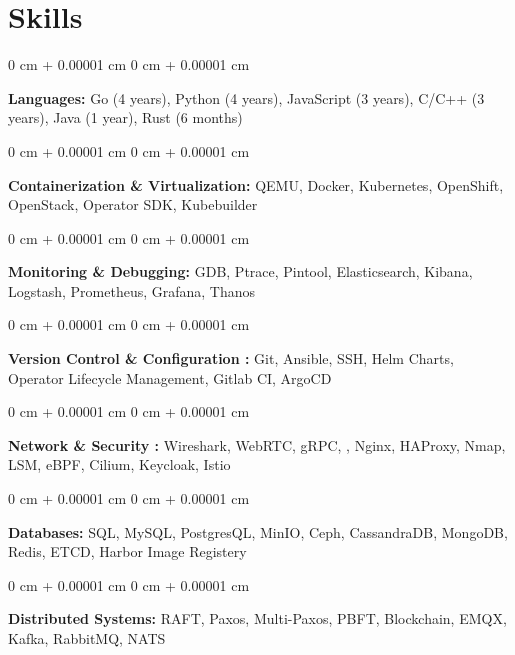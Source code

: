 \documentclass[10pt, letterpaper]{article}
\newenvironment{onecolentry}{
    \begin{adjustwidth}{
        0 cm + 0.00001 cm
    }{
        0 cm + 0.00001 cm
    }
}{
    \end{adjustwidth}
} %
\begin{document}
    \section{Skills}
        \begin{onecolentry}
            \textbf{Languages:} Go (4 years), \hfill Python (4 years), \hfill JavaScript (3 years), \hfill C/C++ (3 years), \hfill Java (1 year), \hfill Rust (6 months)
        \end{onecolentry}
        \vspace{0.15 cm}
        \begin{onecolentry}
            \textbf{Containerization \& Virtualization:} QEMU, \hfill Docker, \hfill Kubernetes, \hfill OpenShift, \hfill OpenStack, \hfill Operator SDK, \hfill Kubebuilder
        \end{onecolentry}
        \vspace{0.15 cm}
        \begin{onecolentry}
            \textbf{Monitoring \& Debugging:} GDB, \hfill Ptrace, \hfill Pintool, \hfill Elasticsearch, \hfill Kibana, \hfill Logstash, \hfill Prometheus, \hfill Grafana, \hfill Thanos
        \end{onecolentry}
        \vspace{0.15 cm}
        \begin{onecolentry}
            \textbf{Version Control \& Configuration :} Git, \hfill Ansible, \hfill SSH, \hfill Helm Charts, \hfill Operator Lifecycle Management, \hfill Gitlab CI, \hfill ArgoCD
        \end{onecolentry}
        \vspace{0.15 cm}
        \begin{onecolentry}
            \textbf{Network \& Security :} Wireshark, \hfill WebRTC, \hfill gRPC, \hfill, Nginx, \hfill HAProxy, \hfill Nmap, \hfill LSM, \hfill eBPF, \hfill Cilium, \hfill Keycloak, \hfill Istio
        \end{onecolentry}
        \vspace{0.15 cm}
        \begin{onecolentry}
            \textbf{Databases:} SQL, \hfill MySQL, \hfill PostgresQL, \hfill MinIO, \hfill Ceph, \hfill CassandraDB, \hfill MongoDB, \hfill Redis, \hfill ETCD, \hfill Harbor Image Registery
        \end{onecolentry}
        \vspace{0.15 cm}
        \begin{onecolentry}
            \textbf{Distributed Systems:} RAFT, Paxos, Multi-Paxos, PBFT, Blockchain, EMQX, Kafka, RabbitMQ, NATS
        \end{onecolentry}
\end{document}
